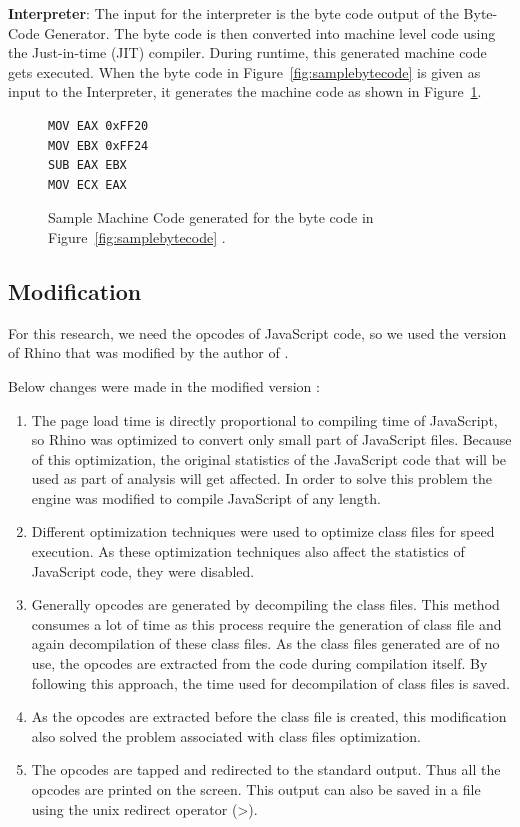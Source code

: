 \textbf{Interpreter}: The input for the interpreter is the byte code output of the Byte-Code Generator. The byte code is then converted into machine level code using the Just-in-time (JIT) compiler. During runtime, this generated machine code gets executed. When the byte code in Figure~\ref{fig:samplebytecode} is given as input to the Interpreter, it generates the machine code as shown in Figure~\ref{fig:samplemachinecode}. 
\begin{figure}
  \centering
\begin{lstlisting}[language=myasm] 
MOV EAX 0xFF20
MOV EBX 0xFF24
SUB EAX EBX
MOV ECX EAX
\end{lstlisting}
    \caption[Sample Machine Code]{Sample Machine Code generated for the byte code in Figure~\ref{fig:samplebytecode} \cite{bib4}.}
    \label{fig:samplemachinecode}
\end{figure}
\subsection{Modification}
For this research, we need the opcodes of JavaScript code, so we used the version of Rhino that was modified by the author of \cite{bib4}.
 
Below changes were made in the modified version \cite{bib4}:

\begin{enumerate}
\item The page load time is directly proportional to compiling time of JavaScript, so Rhino was optimized to convert only small part of JavaScript files. Because of this optimization, the original statistics of the JavaScript code that will be used as part of analysis will get affected. In order to solve this problem the engine was modified to compile JavaScript of any length.
\item Different optimization techniques were used to optimize class files for speed execution. As these optimization techniques also affect the statistics of JavaScript code, they were disabled.
\item Generally opcodes are generated by decompiling the class files. This method consumes a lot of time as this process require the generation of class file and again decompilation of these class files. As the class files generated are of no use, the opcodes are extracted from the code during compilation itself. By following this approach, the time used for decompilation of class files is saved.
\item As the opcodes are extracted before the class file is created, this modification also solved the problem associated with class files optimization.
\item The opcodes are tapped and redirected to the standard output. Thus all the opcodes are printed on the screen. This output can also be saved in a file using the unix redirect operator (>).
\end{enumerate}
 
